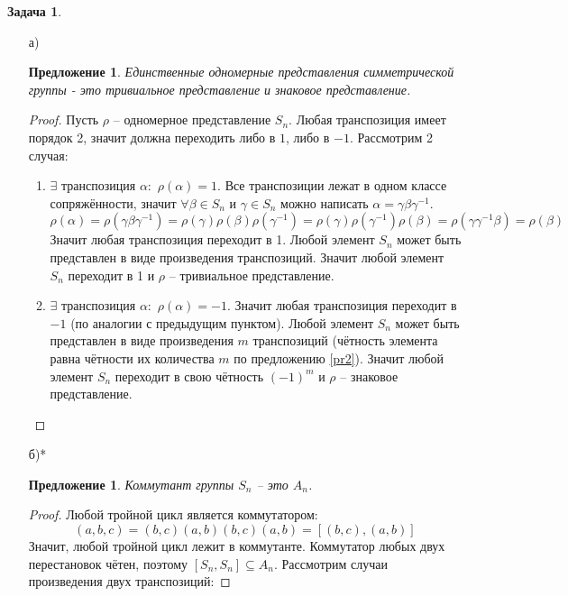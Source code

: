 \documentclass[12pt]{article}
\newtheorem{predl}[theorem]{Предложение}
\theoremstyle{definition}
\newtheorem{zad}{Задача}[section]
\begin{document}
\begin{zad}
\begin{itemize}
    \item[а)]
    \begin{predl}
        Единственные одномерные представления симметрической группы - это тривиальное представление и знаковое представление.
    \end{predl}
    \begin{proof}
        Пусть $\rho$ -- одномерное представление $S_n$. Любая транспозиция имеет порядок 2, значит должна переходить либо в $1$, либо в $-1$. Рассмотрим 2 случая:
        \begin{enumerate}
            \item $\exists$ транспозиция $\alpha:$ $\rho(\alpha)=1$. Все транспозиции лежат в одном классе сопряжённости, значит $\forall\beta\in S_n$ и $\gamma\in S_n$ можно написать $\alpha=\gamma\beta\gamma^{-1}$.
            \begin{equation}
                \rho(\alpha)=\rho(\gamma\beta\gamma^{-1})=\rho(\gamma)\rho(\beta)\rho(\gamma^{-1})=\rho(\gamma)\rho(\gamma^{-1})\rho(\beta)=\rho(\gamma\gamma^{-1}\beta)=\rho(\beta)
            \end{equation}
            Значит любая транспозиция переходит в 1. Любой элемент $S_n$ может быть представлен в виде произведения транспозиций. Значит любой элемент $S_n$ переходит в 1 и $\rho$ -- тривиальное представление.
            \item $\exists$ транспозиция $\alpha:$ $\rho(\alpha)=-1$. Значит любая транспозиция переходит в $-1$ (по аналогии с предыдущим пунктом). Любой элемент $S_n$ может быть представлен в виде произведения $m$ транспозиций (чётность элемента равна чётности их количества $m$ по предложению \ref{pr2}). Значит любой элемент $S_n$ переходит в свою чётность $(-1)^m$ и $\rho$ -- знаковое представление.
        \end{enumerate}
    \end{proof}
    \item[б)*]
    \begin{predl}
        Коммутант группы $S_n$ -- это $A_n$.
    \end{predl}
    \begin{proof}
        Любой тройной цикл является коммутатором:
        \begin{equation}
            (a,b,c)=(b,c)(a,b)(b,c)(a,b)=[(b,c),(a,b)]
        \end{equation}
        Значит, любой тройной цикл лежит в коммутанте. Коммутатор любых двух перестановок чётен, поэтому $[S_n,S_n]\subseteq A_n$. Рассмотрим случаи произведения двух транспозиций:

\end{proof}
\end{itemize}
\end{zad}
\end{document}
